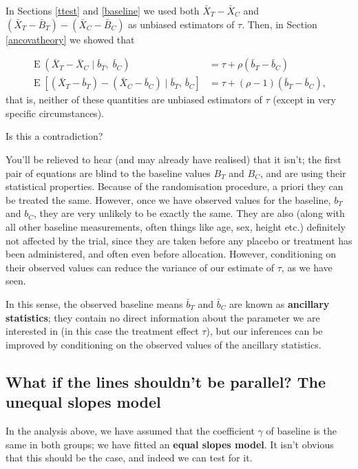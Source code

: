 \documentclass[
  openany]{book}
\theoremstyle{definition}
\theoremstyle{definition}
\theoremstyle{definition}
\theoremstyle{definition}
\theoremstyle{remark}
\begin{document}
In Sections \ref{ttest} and \ref{baseline} we used both \(\bar{X}_T - \bar{X}_C\) and \(\left(\bar{X}_T - \bar{B}_T\right) - \left(\bar{X}_C - \bar{B}_C\right)\) as unbiased estimators of \(\tau\).
Then, in Section \ref{ancovatheory} we showed that

\[
\begin{aligned}
\operatorname{E}\left(\bar{X}_T - \bar{X}_C\mid{\bar{b}_T,\;\bar{b}_C}\right)& = \tau + \rho\left(\bar{b}_T - \bar{b}_C\right)\\
\operatorname{E}\left[\left(\bar{X}_T - \bar{b}_T\right) - \left(\bar{X}_C - \bar{b}_C\right)\mid{\bar{b}_T,\,\bar{b}_C}\right] &= \tau + \left(\rho-1\right)\left(\bar{b}_T - \bar{b}_C\right),
\end{aligned}
\]
that is, neither of these quantities are unbiased estimators of \(\tau\) (except in very specific circumstances).

Is this a contradiction?

You'll be relieved to hear (and may already have realised) that it isn't; the first pair of equations are blind to the baseline values \(B_T\) and \(B_C\), and are using their statistical properties. Because of the randomisation procedure, a priori they can be treated the same. However, once we have observed values for the baseline, \(b_T\) and \(b_C\), they are very unlikely to be exactly the same. They are also (along with all other baseline measurements, often things like age, sex, height etc.) definitely not affected by the trial, since they are taken before any placebo or treatment has been administered, and often even before allocation. However, conditioning on their observed values can reduce the variance of our estimate of \(\tau\), as we have seen.

In this sense, the observed baseline means \(\bar{b}_T\) and \(\bar{b}_C\) are known as \textbf{ancillary statistics}; they contain no direct information about the parameter we are interested in (in this case the treatment effect \(\tau\)), but our inferences can be improved by conditioning on the observed values of the ancillary statistics.

\subsection{What if the lines shouldn't be parallel? The unequal slopes model}\label{what-if-the-lines-shouldnt-be-parallel-the-unequal-slopes-model}

In the analysis above, we have assumed that the coefficient \(\gamma\) of baseline is the same in both groups; we have fitted an \textbf{equal slopes model}. It isn't obvious that this should be the case, and indeed we can test for it.
\end{document}
